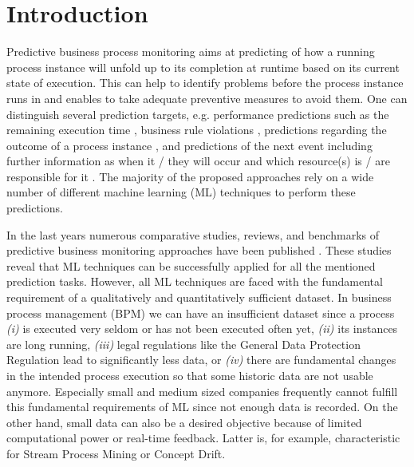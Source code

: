 \documentclass[runningheads]{llncs}
\begin{document}
\section{Introduction}\label{Sec:Introduction}
\vspace{-8pt}
Predictive business process monitoring aims at predicting of how a running process instance will unfold up to its completion at runtime based on its current state of execution.  This can help to identify problems before the process instance runs in and enables to take adequate preventive measures to avoid them. One can distinguish several prediction targets, e.g. performance predictions such as the remaining execution time \cite{RoggeSolti2015}, business rule violations \cite{Maggi2014,Metzger2015}, predictions regarding the outcome of a process instance \cite{TeinemaaBenchmark,Conforti2013}, and predictions of the next event \cite{Evermann2017} including further information as when it / they will occur and which resource(s) is / are responsible for it \cite{camargo_lstm_2019,Schonig:2018:DLP:3362381.3362411}. The majority of the proposed approaches rely on a wide number of different machine learning (ML) techniques to perform these predictions.
 
In the last years numerous comparative studies, reviews, and benchmarks of predictive business monitoring approaches have been published \cite{RamaManeiro2020,Kratsch,TeinemaaBenchmark,francescomarino2018,Verenich2019}. These studies reveal that ML techniques can be successfully applied for all the mentioned prediction tasks. However, all ML techniques are faced with the fundamental requirement of a qualitatively and quantitatively sufficient dataset. In business process management (BPM) we can have an insufficient dataset since a process \textit{(i)} is executed very seldom or has not been executed often yet, \textit{(ii)} its instances are long running, \textit{(iii)} legal regulations like the General Data Protection Regulation lead to significantly less data, or \textit{(iv)} there are fundamental changes in the intended process execution so that some historic data are not usable anymore. Especially small and medium sized companies frequently cannot fulfill this fundamental requirements of ML since not enough data is recorded. On the other hand, small data can also be a desired objective because of limited computational power or real-time feedback. Latter is, for example, characteristic for Stream Process Mining or Concept Drift. 
\end{document}
